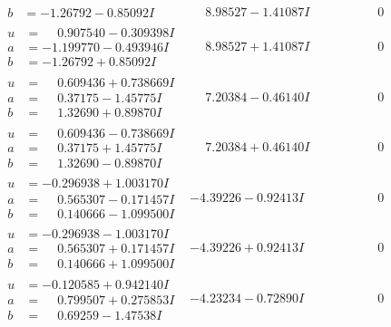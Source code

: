 \documentclass[1p]{elsarticle_modified}
\theoremstyle{definition}
\begin{document}
$$\begin{array}{c|c|c}
\begin{aligned}
b &= -1.26792 - 0.85092 I\end{aligned}
 & \phantom{-}8.98527 - 1.41087 I & \phantom{-0.000000 } 0 \\ \hline\begin{aligned}
u &= \phantom{-}0.907540 - 0.309398 I \\
a &= -1.199770 - 0.493946 I \\
b &= -1.26792 + 0.85092 I\end{aligned}
 & \phantom{-}8.98527 + 1.41087 I & \phantom{-0.000000 } 0 \\ \hline\begin{aligned}
u &= \phantom{-}0.609436 + 0.738669 I \\
a &= \phantom{-}0.37175 - 1.45775 I \\
b &= \phantom{-}1.32690 + 0.89870 I\end{aligned}
 & \phantom{-}7.20384 - 0.46140 I & \phantom{-0.000000 } 0 \\ \hline\begin{aligned}
u &= \phantom{-}0.609436 - 0.738669 I \\
a &= \phantom{-}0.37175 + 1.45775 I \\
b &= \phantom{-}1.32690 - 0.89870 I\end{aligned}
 & \phantom{-}7.20384 + 0.46140 I & \phantom{-0.000000 } 0 \\ \hline\begin{aligned}
u &= -0.296938 + 1.003170 I \\
a &= \phantom{-}0.565307 - 0.171457 I \\
b &= \phantom{-}0.140666 - 1.099500 I\end{aligned}
 & -4.39226 - 0.92413 I & \phantom{-0.000000 } 0 \\ \hline\begin{aligned}
u &= -0.296938 - 1.003170 I \\
a &= \phantom{-}0.565307 + 0.171457 I \\
b &= \phantom{-}0.140666 + 1.099500 I\end{aligned}
 & -4.39226 + 0.92413 I & \phantom{-0.000000 } 0 \\ \hline\begin{aligned}
u &= -0.120585 + 0.942140 I \\
a &= \phantom{-}0.799507 + 0.275853 I \\
b &= \phantom{-}0.69259 - 1.47538 I\end{aligned}
 & -4.23234 - 0.72890 I & \phantom{-0.000000 } 0 \\ \hline\begin{aligned}

\end{aligned}
\end{array}$$
\end{document}
